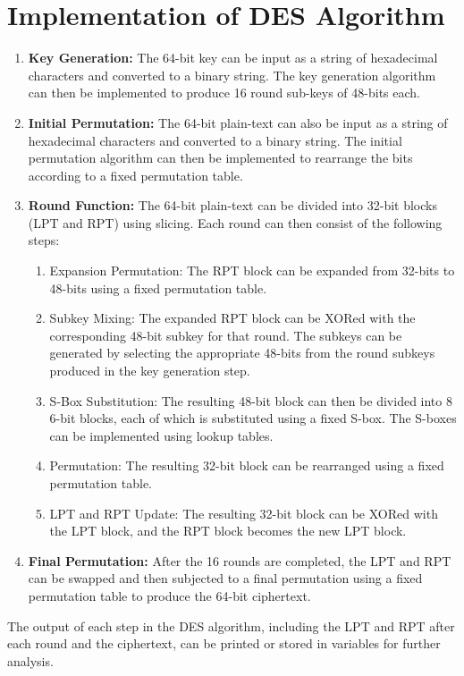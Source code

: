 \documentclass[12pt, letterpaper]{article}
\begin{document}
\section{Implementation of DES Algorithm}

\begin{enumerate}
\item \textbf{Key Generation:} The 64-bit key can be input as a string of hexadecimal characters and converted to a binary string. The key generation algorithm can then be implemented to produce 16 round sub-keys of 48-bits each.

\item \textbf{Initial Permutation:} The 64-bit plain-text can also be input as a string of hexadecimal characters and converted to a binary string. The initial permutation algorithm can then be implemented to rearrange the bits according to a fixed permutation table.

\item \textbf{Round Function:} The 64-bit plain-text can be divided into 32-bit blocks (LPT and RPT) using slicing. Each round can then consist of the following steps:

\begin{enumerate}
\item Expansion Permutation: The RPT block can be expanded from 32-bits to 48-bits using a fixed permutation table.

\item Subkey Mixing: The expanded RPT block can be XORed with the corresponding 48-bit subkey for that round. The subkeys can be generated by selecting the appropriate 48-bits from the round subkeys produced in the key generation step.

\item S-Box Substitution: The resulting 48-bit block can then be divided into 8 6-bit blocks, each of which is substituted using a fixed S-box. The S-boxes can be implemented using lookup tables.

\item Permutation: The resulting 32-bit block can be rearranged using a fixed permutation table.

\item LPT and RPT Update: The resulting 32-bit block can be XORed with the LPT block, and the RPT block becomes the new LPT block.
\end{enumerate}

\item \textbf{Final Permutation:} After the 16 rounds are completed, the LPT and RPT can be swapped and then subjected to a final permutation using a fixed permutation table to produce the 64-bit ciphertext.
\end{enumerate}
The output of each step in the DES algorithm, including the LPT and RPT after each round and the ciphertext, can be printed or stored in variables for further analysis.
\end{document}
